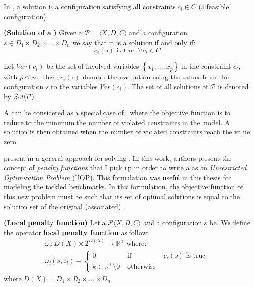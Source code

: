 In \csps, a solution is a configuration satisfying all constraints $c_i \in C$ (a feasible configuration). %

\begin{definition}{\bf (Solution of a \csp)}
\label{solCSP}
Given a \csp{} $\mathcal{P}=\langle X,D,C \rangle$ and a configuration $s \in D_1\times D_2\times\dots\times D_n$ we say that it is a solution if and only if:	
\begin{equation*}
c_i\left(s\right)\text{ is true }\forall c_i \in C
\end{equation*}
\end{definition}

Let $Var(c_i)$ be the set of involved variables $\left\{x_1, \dots, x_p\right\}$ in the constraint $c_i$, with $p\leq n$. Then, $c_i\left(s\right)$ denotes the evaluation using the values from the configuration $s$ to the variables $Var(c_i)$. The set of all solutions of $\mathcal{P}$ is denoted by $\mathnormal{Sol}(\mathcal{P})$.

A \csp{} can be considered as a special case of \cops, where the objective function is to reduce to the minimum the number of violated constraints in the model. A solution is then obtained when the number of violated constraints reach the value zero. 

 present in \cite{Galinier04} a general approach for solving \csps{}. In this work, authors present the concept of {\it penalty functions} that I pick up in order to write a \csp{} as an \textit{Unrestricted Optimization Problem} (UOP). This formulation was useful in this thesis for modeling the tackled benchmarks. In this formulation, the objective function of this new problem must be such that its set of optimal solutions is equal to the solution set of the original (associated) \csp.

\begin{definition}{\bf (Local penalty function)}
\label{def:local_cost}
Let a {\bf \csp} $\mathcal{P}\langle X,D,C \rangle$ and a configuration $s$ be. We define the operator {\bf local penalty function} as follow: 
\begin{equation*}
\begin{array}{l}
	\omega_i:D\left(X\right)\times 2^{D\left(X\right)}\rightarrow\mathbb{R}^+\text{ where: }\\
	\omega_i\left(s,c_i\right)=\left\{
	\begin{array}{lll}
	0 & \text{ if } & c_i(s)\text{ is true }\\
	k \in \mathbb{R}^+ \setminus {0} & \text{ otherwise } &
	\end{array}
	\right.
\end{array}
\end{equation*}
where $D\left(X\right) = D_1\times D_2 \times\dots\times D_n$
\end{definition}

